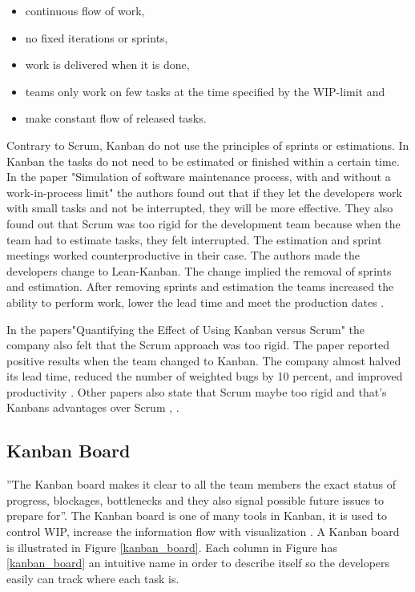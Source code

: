\documentclass[UKenglish]{ifimaster}  %
\begin{document}
\begin{itemize}
\item continuous flow of work,
\item	no fixed iterations or sprints,
\item work is delivered when it is done,
\item teams only work on few tasks at the time specified by the WIP-limit and
\item make constant flow of released tasks.
\end{itemize}


Contrary to Scrum, Kanban do not use the principles of sprints or estimations. In Kanban the tasks do not need to be estimated or finished within a certain time. In the paper "Simulation of software maintenance process, with and without a work-in-process limit" \parencite{SMR:SMR1599} the authors found out that if they let the developers work with small tasks and not be interrupted, they will be more effective. They also found out that Scrum was too rigid for the development team because when the team had to estimate tasks, they felt interrupted.  The estimation and sprint meetings worked counterproductive in their case. The authors made the developers change to Lean-Kanban.  The change implied the removal of sprints and estimation. After removing sprints and estimation the teams increased the ability to perform work, lower the lead time and meet the production dates \parencite{SMR:SMR1599}.

In the papers"Quantifying the Effect of Using Kanban versus Scrum" the company also felt that the Scrum approach was too rigid. The paper reported positive results when the team changed to Kanban.  The company almost halved its lead time, reduced the number of weighted bugs by 10 percent, and improved productivity \parencite{Dag}. Other papers also state that Scrum maybe too rigid and that's Kanbans advantages over Scrum \parencite{beedle1999scrum}, \parencite{brekkanintroducing} .  

\subsection {Kanban Board}
''The Kanban board makes it clear to all the team members the exact status of progress, blockages, bottlenecks and they also signal possible future issues to prepare for''\parencite{Joyce}.  The Kanban board is one of many tools in Kanban, it is used to control WIP, increase the information flow with visualization \parencite{SMR:SMR1599}. A Kanban board is illustrated in Figure \ref{kanban_board}. Each column in Figure has \ref{kanban_board} an intuitive name in order to describe itself so the developers easily can track where each task is. 
\end{document}
